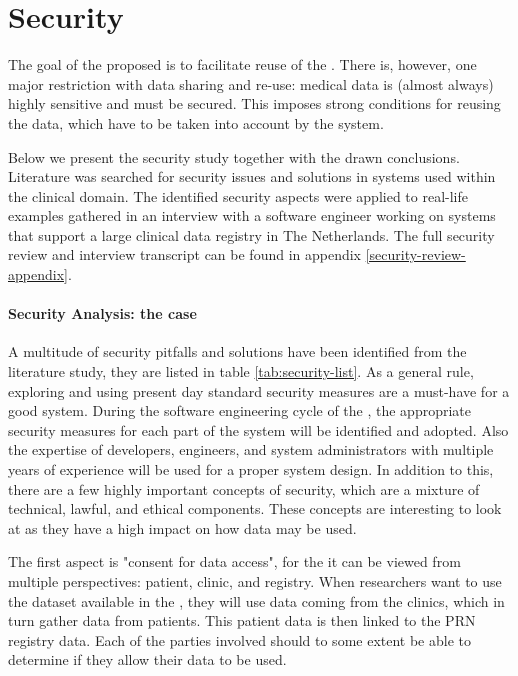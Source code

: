 \section{Security}
\label{security}

The goal of the proposed \ivfsystem{} is to facilitate reuse of the \projectdata{}.
There is, however, one major restriction with data sharing and re-use: medical data is (almost always) highly sensitive and must be secured. 
This imposes strong conditions for reusing the data, which have to be taken into account by the system.

Below we present the security study together with the drawn conclusions.
Literature was searched for security issues and solutions in systems used within the clinical domain.
The identified security aspects were applied to real-life examples gathered in an interview with a software engineer working on systems that support a large clinical data registry in The Netherlands.
The full security review and interview transcript can be found in appendix \ref{security-review-appendix}.

\paragraph{Security Analysis: the \ivfsystem{} case}
\label{security-summarisation-analysis}

A multitude of security pitfalls and solutions have been identified from the literature study, they are listed in table \ref{tab:security-list}.
As a general rule, exploring and using present day standard security measures are a must-have for a good system.
During the software engineering cycle of the \ivfsystem{}, the appropriate security measures for each part of the system will be identified and adopted.
Also the expertise of developers, engineers, and system administrators with multiple years of experience will be used for a proper system design.
In addition to this, there are a few highly important concepts of security, which are a mixture of technical, lawful, and ethical components.
These concepts are interesting to look at as they have a high impact on how data may be used.

The first aspect is "consent for data access", for the \project{} it can be viewed from multiple perspectives: patient, clinic, and registry.
When researchers want to use the dataset available in the \ivfsystem{}, they will use data coming from the clinics, which in turn gather data from patients.
This patient data is then linked to the PRN registry data.
Each of the parties involved should to some extent be able to determine if they allow their data to be used.

